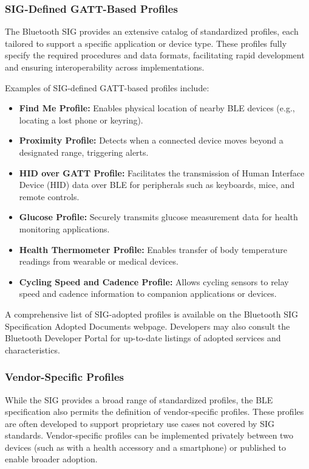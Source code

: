 \subsubsection{SIG-Defined GATT-Based Profiles}

The Bluetooth SIG provides an extensive catalog of standardized profiles, each tailored to support a specific application or device type. These profiles fully specify the required procedures and data formats, facilitating rapid development and ensuring interoperability across implementations.

Examples of SIG-defined GATT-based profiles include:

\begin{itemize}
    \item \textbf{Find Me Profile:} Enables physical location of nearby BLE devices (e.g., locating a lost phone or keyring).
    \item \textbf{Proximity Profile:} Detects when a connected device moves beyond a designated range, triggering alerts.
    \item \textbf{HID over GATT Profile:} Facilitates the transmission of Human Interface Device (HID) data over BLE for peripherals such as keyboards, mice, and remote controls.
    \item \textbf{Glucose Profile:} Securely transmits glucose measurement data for health monitoring applications.
    \item \textbf{Health Thermometer Profile:} Enables transfer of body temperature readings from wearable or medical devices.
    \item \textbf{Cycling Speed and Cadence Profile:} Allows cycling sensors to relay speed and cadence information to companion applications or devices.
\end{itemize}

A comprehensive list of SIG-adopted profiles is available on the Bluetooth SIG Specification Adopted Documents webpage. Developers may also consult the Bluetooth Developer Portal for up-to-date listings of adopted services and characteristics.

\subsubsection{Vendor-Specific Profiles}

While the SIG provides a broad range of standardized profiles, the BLE specification also permits the definition of vendor-specific profiles. These profiles are often developed to support proprietary use cases not covered by SIG standards. Vendor-specific profiles can be implemented privately between two devices (such as with a health accessory and a smartphone) or published to enable broader adoption.

